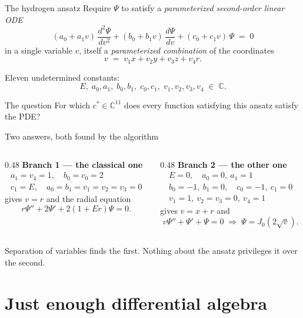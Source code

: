 \documentclass[10pt,aspectratio=169]{beamer}
\newcommand{\C}{\mathbb{C}}
\newcommand{\cstar}{c^{*}}
\begin{document}
\begin{frame}{The hydrogen ansatz}
Require $\Psi$ to satisfy a \emph{parameterized second-order linear ODE}
\[
  (a_{0}+a_{1}v)\,\frac{d^{2}\Psi}{dv^{2}}
  + (b_{0}+b_{1}v)\,\frac{d\Psi}{dv}
  + (c_{0}+c_{1}v)\,\Psi \;=\; 0
\]
in a single variable $v$, itself a \emph{parameterized combination} of the
coordinates
\[
  v \;=\; v_{1}x + v_{2}y + v_{3}z + v_{4}r .
\]

\pause
Eleven undetermined constants:
\[
  E,\; a_{0}, a_{1},\; b_{0}, b_{1},\; c_{0}, c_{1},\;
  v_{1}, v_{2}, v_{3}, v_{4}\;\in\;\C .
\]

\pause
\begin{alertblock}{The question}
For which $\cstar \in \C^{11}$ does every function satisfying this ansatz satisfy
the PDE?
\end{alertblock}
\end{frame}

\begin{frame}{Two answers, both found by the algorithm}
\begin{columns}[T]
\begin{column}{0.48\textwidth}
\textbf{Branch 1 --- the classical one}
\[
  \begin{gathered}
    a_{1}=v_{4}=1,\quad b_{0}=c_{0}=2 \\
    c_{1}=E,\quad a_{0}=b_{1}=v_{1}=v_{2}=v_{3}=0
  \end{gathered}
\]
gives $v=r$ and the radial equation
\[
  r\Psi''+2\Psi'+2(1+Er)\Psi=0 .
\]
\end{column}
\pause
\begin{column}{0.48\textwidth}
\textbf{Branch 2 --- the other one}
\[
  \begin{gathered}
    E=0,\quad a_{0}=0,\ a_{1}=1 \\
    b_{0}=-1,\ b_{1}=0,\quad c_{0}=-1,\ c_{1}=0 \\
    v_{1}=1,\ v_{2}=v_{3}=0,\ v_{4}=1
  \end{gathered}
\]
gives $v=x+r$ and
\[
  v\Psi'' + \Psi' + \Psi = 0
  \;\Rightarrow\;
  \Psi = J_{0}(2\sqrt{v}).
\]
\end{column}
\end{columns}

\pause
\bigskip
Separation of variables finds the first. Nothing about the ansatz privileges it
over the second.
\end{frame}


\section{Just enough differential algebra}
\end{document}
